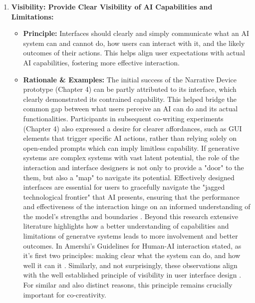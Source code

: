 \begin{enumerate}[label=\arabic*., wide, labelindent=0pt]

\item \textbf{Visibility: Provide Clear Visibility of AI Capabilities and Limitations:}
    \begin{itemize}[label=\textbullet, leftmargin=*]
        \item \textbf{Principle:} Interfaces should clearly and simply communicate what an AI system can and cannot do, how users can interact with it, and the likely outcomes of their actions. This helps align user expectations with actual AI capabilities, fostering more effective interaction.
        \item \textbf{Rationale \& Examples:} The initial success of the Narrative Device prototype (Chapter 4) can be partly attributed to its interface, which clearly demonstrated its contrained capability. This helped bridge the common gap between what users perceive an AI can do and its actual functionalities. Participants in subsequent co-writing experiments (Chapter 4) also expressed a desire for clearer affordances, such as GUI elements that trigger specific AI actions, rather than relying solely on open-ended prompts which can imply limitless capability. If generative systems are complex systems with vast latent potential, the role of the interaction and interface designers is not only to provide a "door" to the them, but also a "map" to navigate its potential. Effectively designed interfaces are essential for users to gracefully navigate the "jagged technological frontier" that AI presents, ensuring that the performance and effectiveness of the interaction hinge on an informed understanding of the model's strengths and boundaries \cite{DellAcqua2023-og}. Beyond this research extensive literature highlights how a better understanding of capabilities and limitations of generatve systems leads to more involvement and better outcomes. In Amershi's Guidelines for Human-AI interaction stated, as it's first two principles: making clear what the system can do, and how well it can it \cite{Amershi2019-wu}. Similarly, and not surprisingly, these observations align with the well established principle of visibility in user interface design \cite{Nielsen1994-df}. For similar and also distinct reasons, this principle remains crucially important for co-creativity. 
    \end{itemize}


\end{enumerate}
